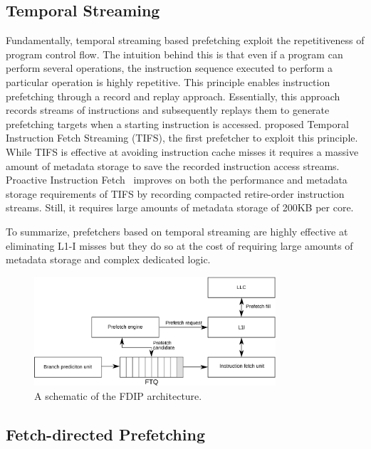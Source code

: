 \documentclass[../main.tex]{subfiles}
\begin{document}
\begin{refsection}
\subsection{Temporal Streaming} Fundamentally, temporal streaming
based prefetching exploit the repetitiveness of program control
flow. The intuition behind this is that even if a program can perform
several operations, the instruction sequence executed to perform a
particular operation is highly repetitive. This principle enables
instruction prefetching through a record and replay
approach. Essentially, this approach records streams of instructions
and subsequently replays them to generate prefetching targets when a
starting instruction is accessed. \textcite{ferdman08_tempor} proposed
Temporal Instruction Fetch Streaming (TIFS), the first prefetcher to
exploit this principle. While TIFS is effective at avoiding
instruction cache misses it requires a massive amount of metadata
storage to save the recorded instruction access streams.  Proactive
Instruction Fetch~\cite{ferdman11_proac_instr_fetch} improves on both
the performance and metadata storage requirements of TIFS by recording
compacted retire-order instruction streams. Still, it requires large
amounts of metadata storage of 200KB per core.  %

To summarize, prefetchers based on temporal streaming are highly
effective at eliminating L1-I misses but they do so at the cost of
requiring large amounts of metadata storage and complex dedicated
logic.

\begin{figure}[ht]
  \centering
  \includegraphics[width=0.8\textwidth]{figures/fdip1.pdf}
  \caption{\label{fig:fdip} A schematic of the FDIP architecture.}
\end{figure}

\subsection{Fetch-directed Prefetching}


\end{refsection}
\end{document}
